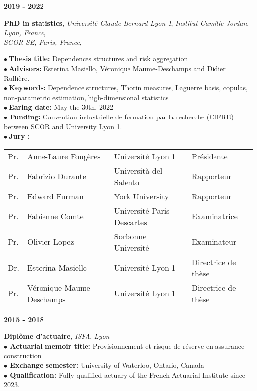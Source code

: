 \documentclass[a4paper,11pt]{article}
\newcommand{\tabcv}[2]{
\begin{minipage}[t]{0.12\linewidth}
\textbf{\footnotesize #1}
\end{minipage}\hfill
\begin{minipage}[t]{0.85\linewidth}
#2
\end{minipage}
\vspace{1em}
}
\begin{document}
\begin{flushleft}
\tabcv{2019 - 2022}{
\textbf{PhD in statistics}, \textit{Université Claude Bernard Lyon 1}, \textit{Institut Camille Jordan}, \textit{Lyon, France}, \\ \textit{SCOR SE, Paris, France}, \textit{}\\[0.5em]
{\footnotesize \textbf{$\bullet\ $Thesis title:} {Dependences structures and risk aggregation}\\
\textbf{$\bullet\ $Advisors:} Esterina Masiello, Véronique Maume-Deschamps and Didier Rullière.\\
\textbf{$\bullet\ $Keywords:} {Dependence structures, Thorin measures, Laguerre basis, copulas, non-parametric estimation, high-dimensional statistics}\\
\textbf{$\bullet\ $Earing date:} May the 30th, 2022\\
\textbf{$\bullet$ Funding:} Convention industrielle de formation par la recherche (CIFRE) between SCOR and University Lyon 1.\\
\textbf{$\bullet\ $Jury :} \\[0.25em]
\begin{tabular}{llll}
{Pr.} & {Anne-Laure Fougères}       & {Université Lyon 1} & {Présidente} \\
{Pr.} & {Fabrizio Durante}          & {Università del Salento} & {Rapporteur} \\
{Pr.} & {Edward Furman}             & {York University} & {Rapporteur} \\
{Pr.} & {Fabienne Comte}            & {Université Paris Descartes} & {Examinatrice} \\
{Pr.} & {Olivier Lopez}             & {Sorbonne Université} & {Examinateur} \\
{Dr.} & {Esterina Masiello}         & {Université Lyon 1} & {Directrice de thèse} \\
{Pr.} & {Véronique Maume-Deschamps} & {Université Lyon 1} & {Directrice de thèse} \\
\end{tabular}}
}

\tabcv{2015 - 2018}{
\textbf{Diplôme d'actuaire}, \textit{ISFA}, \textit{Lyon}\\[0.5em]
{\footnotesize \textbf{$\bullet$ Actuarial memoir title:} Provisionnement et risque de réserve en assurance construction\\
\footnotesize \textbf{$\bullet$ Exchange semester:} University of Waterloo, Ontario, Canada\\
\footnotesize \textbf{$\bullet$ Qualification:} Fully qualified actuary of the French Actuarial Institute since 2023. 
}
}


\end{flushleft}
\end{document}
